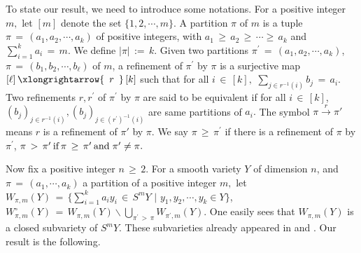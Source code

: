 \documentclass[12pt,reqno]{amsart}
\theoremstyle{definition}
\numberwithin{equation}{section}
\begin{document}
To state our result, we need to introduce some notations. For a positive integer $m,$ let $[m]$ denote the set $\{1,2,\cdots , m\}$. A partition $\pi$ of $m$ is a tuple $\pi\,=\, ( a_{1},a_{2},\cdots, a_{k})$ of positive integers, with $a_{1}\, \geq\, a_{2}\, \geq\, \cdots  \geq\, a_{k}$ and $ \sum_{i=1}^{k}a_{i}\,=\,m$. We define $ |\pi|\,:=\, k.$ Given two partitions $ \pi^{\prime}\,=\, (a_{1},a_{2},\cdots, a_{k})$, $ \pi\,=\, (b_{1},b_{2},\cdots, b_{\ell})$ of $m$, a refinement of $\pi^{\prime}$ by $\pi$  is a surjective map $ [\ell] \,\xlongrightarrow{\,\,\,r\,\,\,}\, [k] $ such that for all $ i\, \in\, [k],$ $ \sum_{j \in r^{-1}(i)}b_{j}\,=\, a_{i} $. Two refinements $ r, r^{\prime}$ of $\pi^{\prime}$ by $ \pi$ are said to be equivalent if for all $ i\, \in\, [k] $, $ (b_{j})_{j\in r^{-1}(i)}, (b_{j})_{j\in (r^{\prime})^{-1}(i)} $ are same partitions  of $a_{i}.$ The symbol $\pi\xrightarrow{r}\pi'$ means $r$ is a refinement of $\pi'$ by $\pi$. We say $\pi\, \geq\, \pi^{\prime}$ if there is a refinement of $ \pi $ by $ \pi^{\prime}$, $\pi\, >\, \pi^{\prime} \hspace{2pt} \textnormal{if} \hspace{2pt} \pi\, \geq\, \pi^{\prime}\hspace{2pt} \textnormal{and}  \hspace{3pt} \pi^{\prime} \neq \pi.$

Now fix a positive integer $n\,\geq\, 2$. For a smooth variety $Y$ of dimension $n$, and $ \pi\,=\, (a_{1},\cdots,a_{k})$ a partition of a positive integer $m,$ let $ W_{\pi,m}(Y)\,=\, \{ \sum_{i=1}^{k}a_{i}y_{i}\, \in\, S^{m}Y \, \, | \, \, y_{1},y_{2},\cdots,y_{k} \in Y\}$, $ W_{\pi,m}^{\circ}(Y)\,=\, W_{\pi,m}(Y) \backslash \underset {{\pi^{\prime}\, >\, \pi}}{\bigcup} W_{\pi^{\prime},m}(Y)$. One easily sees that $W_{\pi, m}(Y)$ is a closed subvariety of $ S^{m}Y$. These subvarieties already appeared in {\cite[Section 2.1]{Sh}} and {\cite[Proposition 3]{Gir}}. Our result is the following.
\end{document}
